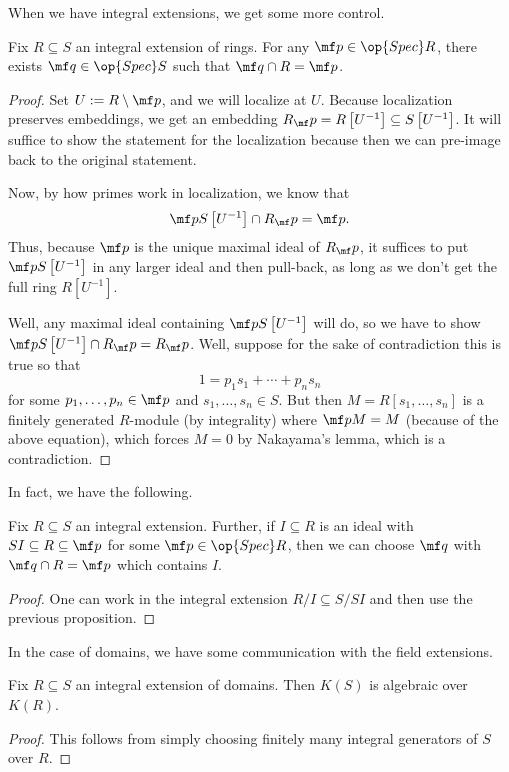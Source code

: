 When we have integral extensions, we get some more control.
\begin{proposition}
	Fix $R\subseteq S$ an integral extension of rings. For any $\mf p\in\op{Spec}R$, there exists $\mf q\in\op{Spec}S$ such that $\mf q\cap R=\mf p$.
\end{proposition}
\begin{proof}
	Set $U:=R\setminus\mf p$, and we will localize at $U$. Because localization preserves embeddings, we get an embedding $R_\mf p=R\left[U^{-1}\right]\subseteq S\left[U^{-1}\right]$. It will suffice to show the statement for the localization because then we can pre-image back to the original statement.

	Now, by how primes work in localization, we know that
	\[\mf pS\left[U^{-1}\right]\cap R_\mf p=\mf p.\]
	Thus, because $\mf p$ is the unique maximal ideal of $R_\mf p$, it suffices to put $\mf pS\left[U^{-1}\right]$ in any larger ideal and then pull-back, as long as we don't get the full ring $R\left[U^{-1}\right]$.

	Well, any maximal ideal containing $\mf pS\left[U^{-1}\right]$ will do, so we have to show $\mf pS\left[U^{-1}\right]\cap R_\mf p=R_\mf p$. Well, suppose for the sake of contradiction this is true so that
	\[1=p_1s_1+\cdots+p_ns_n\]
	for some $p_1,\ldots,p_n\in\mf p$ and $s_1,\ldots,s_n\in S$. But then $M=R[s_1,\ldots,s_n]$ is a finitely generated $R$-module (by integrality) where $\mf pM=M$ (because of the above equation), which forces $M=0$ by Nakayama's lemma, which is a contradiction.
\end{proof}
In fact, we have the following.
\begin{corollary}
	Fix $R\subseteq S$ an integral extension. Further, if $I\subseteq R$ is an ideal with $SI\subseteq R\subseteq\mf p$ for some $\mf p\in\op{Spec}R$, then we can choose $\mf q$ with $\mf q\cap R=\mf p$ which contains $I$.
\end{corollary}
\begin{proof}
	One can work in the integral extension $R/I\subseteq S/SI$ and then use the previous proposition.
\end{proof}
In the case of domains, we have some communication with the field extensions. 
\begin{lemma}
	Fix $R\subseteq S$ an integral extension of domains. Then $K(S)$ is algebraic over $K(R)$.
\end{lemma}
\begin{proof}
	This follows from simply choosing finitely many integral generators of $S$ over $R$.
\end{proof}
